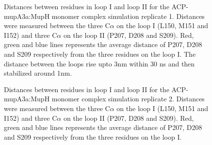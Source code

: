		\setlength\fboxsep{5pt}
		\setlength\fboxrule{1.5pt}
		\begin{figure}[htbp]
		\centering
		\caption[Distances between residues in loop I and loop II for the ACP-mupA3a:MupH monomer complex simulation replicate 1.]{Distances between residues in loop I and loop II for the ACP-mupA3a:MupH monomer complex simulation replicate 1. Distances were measured between the three C$ \alpha $ on the loop I (L150, M151 and I152) and three C$ \alpha $ on the loop II (P207, D208 and S209). Red, green and blue lines represents the average distance of P207, D208 and S209 respectively from the three residues on the loop I. The distance between the loops rise upto 3nm within 30 ns and then stabilized around 1nm.}
		\label{fig:AcpSpmMuphCyaSim0}
		\end{figure}	

		\setlength\fboxsep{5pt}
		\setlength\fboxrule{1.5pt}
		\begin{figure}[htbp]
		\centering
		\caption[Distances between residues in loop I and loop II for the ACP-mupA3a:MupH monomer complex simulation replicate 2.]{Distances between residues in loop I and loop II for the ACP-mupA3a:MupH monomer complex simulation replicate 2. Distances were measured between the three C$ \alpha $ on the loop I (L150, M151 and I152) and three C$ \alpha $ on the loop II (P207, D208 and S209). Red, green and blue lines represents the average distance of P207, D208 and S209 respectively from the three residues on the loop I.}
		\label{fig:AcpSpmMuphCyaSim1}
		\end{figure}	


